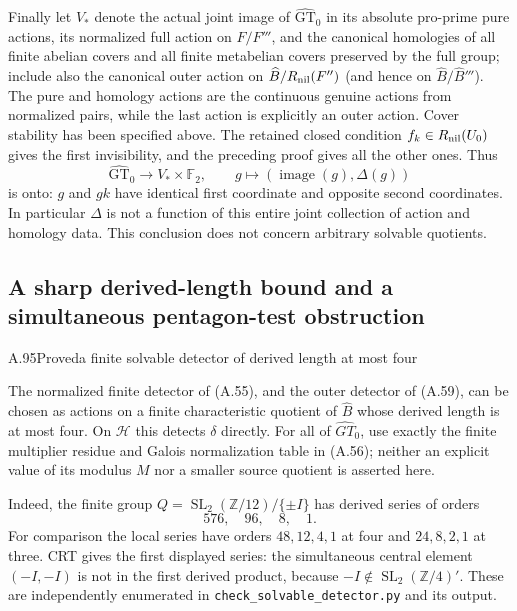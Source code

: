 Finally let $V_*$ denote the actual joint image of
$\widehat{\mathrm{GT}}_0$ in its absolute pro-prime pure
actions, its normalized full action on $F/F'''$, and the
canonical homologies of all finite abelian covers and all
finite metabelian covers preserved by the full group; include
also the canonical outer action on
$\widehat B/R_{\rm nil}(F'')$ (and hence on
$\widehat B/\widehat B'''$).
The pure and homology actions are the continuous genuine
actions from normalized pairs, while the last action is
explicitly an outer action. Cover stability has been
specified above. The retained closed condition
$f_k\in R_{\rm nil}(U_0)$ gives the first invisibility,
and the preceding proof gives all the other ones. Thus
\[
 \widehat{\mathrm{GT}}_0\longrightarrow V_*\times\mathbb F_2,
 \qquad g\longmapsto(\operatorname{image}(g),\Delta(g))
\]
is onto: $g$ and $gk$ have identical first coordinate and
opposite second coordinates. In particular $\Delta$ is not
a function of this entire joint collection of action and
homology data. This conclusion does not concern arbitrary
solvable quotients.

\subsection{A sharp derived-length bound and a simultaneous pentagon-test obstruction}


\begin{statement}{A.95}{Proved}{a finite solvable detector of derived length at most four}
\end{statement}
The normalized finite detector of (A.55), and the outer detector
of (A.59), can be chosen as actions on a finite characteristic
quotient of $\widehat B$ whose derived length is at most four.
On $\mathcal H$ this detects $\delta$ directly. For all of
$\widehat{GT}_0$, use exactly the finite multiplier residue and
Galois normalization table in (A.56); neither an explicit value
of its modulus $M$ nor a smaller source quotient is asserted here.

Indeed, the finite group
$Q=\operatorname{SL}_2(\mathbb Z/12)/\{\pm I\}$ has derived
series of orders
\[
                     576,\quad96,\quad8,\quad1.
\]
For comparison the local series have orders
$48,12,4,1$ at four and $24,8,2,1$ at three. CRT gives the
first displayed series: the simultaneous central element
$(-I,-I)$ is not in the first derived product, because
$-I\notin\operatorname{SL}_2(\mathbb Z/4)'$.
These are independently enumerated in
\texttt{check\_solvable\_detector.py} and its output.

